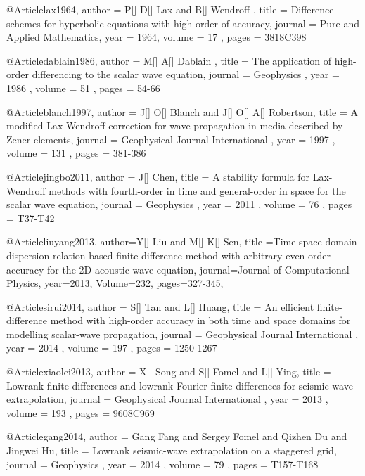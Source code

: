 @Article{lax1964,
 author =  { P[] D[] Lax and B[] Wendroff },
 title =   {Difference schemes for hyperbolic equations with high order of accuracy},
 journal = { Pure and Applied Mathematics},
 year =    { 1964},
 volume =  { 17 },
 pages =   { 381\A8C398 }
}

@Article{dablain1986,
 author =  { M[] A[] Dablain },
 title =   {The application of high-order differencing to the scalar wave equation},
 journal = { Geophysics },
 year =    { 1986 },
 volume =  { 51 },
 pages =   { 54-66 }
}


@Article{blanch1997,
 author =  { J[] O[] Blanch and J[] O[] A[] Robertson},
 title =   {A modified Lax-Wendroff correction for wave propagation in media described by Zener elements},
 journal = { Geophysical Journal International },
 year =    { 1997 },
 volume =  { 131 },
 pages =   { 381-386 }
}

@Article{jingbo2011,
 author =  { J[] Chen},
 title =   {A stability formula for Lax-Wendroff methods with fourth-order in time and general-order in space for the scalar wave equation},
 journal = { Geophysics },
 year =    { 2011 },
 volume =  { 76 },
 pages =   { T37-T42 }
}

@Article{liuyang2013,
  author={Y[] Liu and M[] K[] Sen},
  title ={Time-space domain dispersion-relation-based finite-difference method with arbitrary even-order accuracy for the 2{D} acoustic wave equation},
  journal={Journal of Computational Physics},
  year=2013,
  Volume=232,
  pages={327-345},
}






@Article{sirui2014,
 author =  { S[] Tan and L[] Huang},
 title =   {An efficient finite-difference method with high-order accuracy in both time and space domains for modelling scalar-wave propagation},
 journal = { Geophysical Journal International },
 year =    { 2014 },
 volume =  { 197 },
 pages =   { 1250-1267 }
}

@Article{xiaolei2013,
 author =  { X[] Song and S[] Fomel and L[] Ying},
 title =   {Lowrank finite-differences and lowrank {F}ourier finite-differences for seismic wave extrapolation},
 journal = { Geophysical Journal International },
 year =    { 2013 },
 volume =  { 193 },
 pages =   { 960\A8C969 }
}

@Article{gang2014,
 author =  { Gang Fang and Sergey Fomel and Qizhen Du and Jingwei Hu},
 title =   {Lowrank seismic-wave extrapolation on a staggered grid},
 journal = { Geophysics },
 year =    { 2014 },
 volume =  { 79 },
 pages =   { T157-T168}
}


